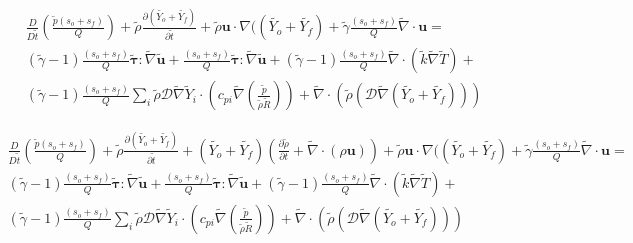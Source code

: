\documentclass[preprint,12pt,authoryear]{elsarticle}
\begin{document}
\begin{equation}
\begin{split}
	\frac{D }{D\tilde{t}}
	\left(
		\frac{\tilde{p}(s_o+s_f)}{Q}
	\right)
	+
	\tilde{\rho} \frac{\partial (\tilde{Y_o}+\tilde{Y_f})}{\partial \tilde{t}}
	+
	\tilde{\rho} {\mathbf{u}}\cdot\nabla( (\tilde{Y_o}+\tilde{Y_f})
	+
	\tilde{\gamma}
	\frac{(s_o+s_f)}{Q}
	\tilde{\nabla}\cdot{\mathbf{u}}
        =
	\\
	(\tilde{\gamma}-1)
	\frac{(s_o+s_f)}{Q}
        \pmb{\tilde{\tau}}:\tilde{\nabla} \tilde{\mathbf{u}} 
        + 
	\frac{(s_o+s_f)}{Q}
        \pmb{\tilde{\tau}}:\tilde{\nabla} \tilde{\mathbf{u}} 
        + 
	(\tilde{\gamma}-1)
	\frac{(s_o+s_f)}{Q}
        \tilde{\nabla} \cdot (\tilde{k}\tilde{\nabla} \tilde{T})
        +
	\\
	(\tilde{\gamma}-1)
	\frac{(s_o+s_f)}{Q}
        \sum\limits_i 
        \tilde{\rho}
        \mathcal{D}
        \tilde{\nabla}
        \tilde{Y}_i     
        \cdot
        \left(
                c_{pi}
                \tilde{\nabla}
                \left(
                	\frac{\tilde{p}}{\tilde{\rho}\tilde{R}}
                \right)
        \right)
	+
	\tilde{\nabla}
	\cdot
	\left( 
		\tilde{\rho} 
		\left( 
			\mathcal{D}\tilde{\nabla} (\tilde{Y_o}+\tilde{Y_f})
		\right) 
	\right) 
\end{split}
\end{equation}

\begin{equation}
\begin{split}
	\frac{D }{D\tilde{t}}
	\left(
		\frac{\tilde{p}(s_o+s_f)}{Q}
	\right)
	+
	\tilde{\rho} \frac{\partial (\tilde{Y_o}+\tilde{Y_f})}{\partial \tilde{t}}
	+
 	(\tilde{Y_o}+\tilde{Y_f})
	\left(
		\frac{\partial \tilde{\rho}}{\partial t}
		+
		\tilde{\nabla}\cdot(\rho\mathbf{u})
	\right)
	+
	\tilde{\rho} {\mathbf{u}}\cdot\nabla( (\tilde{Y_o}+\tilde{Y_f})
	+
	\tilde{\gamma}
	\frac{(s_o+s_f)}{Q}
	\tilde{\nabla}\cdot{\mathbf{u}}
        =
	\\
	(\tilde{\gamma}-1)
	\frac{(s_o+s_f)}{Q}
        \pmb{\tilde{\tau}}:\tilde{\nabla} \tilde{\mathbf{u}} 
        + 
	\frac{(s_o+s_f)}{Q}
        \pmb{\tilde{\tau}}:\tilde{\nabla} \tilde{\mathbf{u}} 
        + 
	(\tilde{\gamma}-1)
	\frac{(s_o+s_f)}{Q}
        \tilde{\nabla} \cdot (\tilde{k}\tilde{\nabla} \tilde{T})
        +
	\\
	(\tilde{\gamma}-1)
	\frac{(s_o+s_f)}{Q}
        \sum\limits_i 
        \tilde{\rho}
        \mathcal{D}
        \tilde{\nabla}
        \tilde{Y}_i     
        \cdot
        \left(
                c_{pi}
                \tilde{\nabla}
                \left(
                	\frac{\tilde{p}}{\tilde{\rho}\tilde{R}}
                \right)
        \right)
	+
	\tilde{\nabla}
	\cdot
	\left( 
		\tilde{\rho} 
		\left( 
			\mathcal{D}\tilde{\nabla} (\tilde{Y_o}+\tilde{Y_f})
		\right) 
	\right) 
\end{split}
\end{equation}
\end{document}
